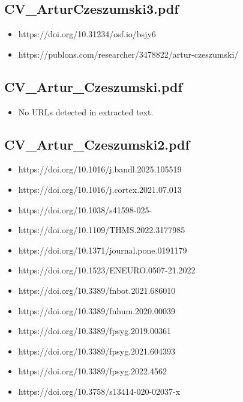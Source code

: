 \documentclass[
  oneside]{article}
\providecommand{\tightlist}{%
  \setlength{\itemsep}{0pt}\setlength{\parskip}{0pt}}
\begin{document}
\subsection{CV\_ArturCzeszumski3.pdf}\label{cv_arturczeszumski3.pdf}

\begin{itemize}
\tightlist
\item
  https://doi.org/10.31234/osf.io/bsjy6
\item
  https://publons.com/researcher/3478822/artur-czeszumski/
\end{itemize}

\subsection{CV\_Artur\_Czeszumski.pdf}\label{cv_artur_czeszumski.pdf}

\begin{itemize}
\tightlist
\item
  No URLs detected in extracted text.
\end{itemize}

\subsection{CV\_Artur\_Czeszumski2.pdf}\label{cv_artur_czeszumski2.pdf}

\begin{itemize}
\tightlist
\item
  https://doi.org/10.1016/j.bandl.2025.105519
\item
  https://doi.org/10.1016/j.cortex.2021.07.013
\item
  https://doi.org/10.1038/s41598-025-
\item
  https://doi.org/10.1109/THMS.2022.3177985
\item
  https://doi.org/10.1371/journal.pone.0191179
\item
  https://doi.org/10.1523/ENEURO.0507-21.2022
\item
  https://doi.org/10.3389/fnbot.2021.686010
\item
  https://doi.org/10.3389/fnhum.2020.00039
\item
  https://doi.org/10.3389/fpsyg.2019.00361
\item
  https://doi.org/10.3389/fpsyg.2021.604393
\item
  https://doi.org/10.3389/fpsyg.2022.4562
\item
  https://doi.org/10.3758/s13414-020-02037-x
\end{itemize}
\end{document}
